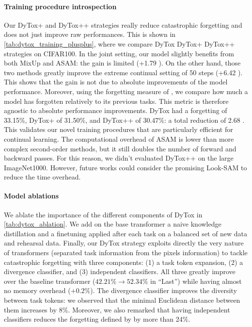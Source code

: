 \paragraph{Training procedure introspection} Our DyTox+ and DyTox++ strategies really reduce
catastrophic forgetting and does not just improve raw performances. This is shown in
\autoref{tab:dytox_training_plusplus}, where we compare DyTox \vs DyTox+ \vs DyTox++ strategies on
CIFAR100. In the joint setting, our model slightly benefits from both MixUp and ASAM: the gain is
limited (+1.79 \pp). On the other hand, those two methods greatly improve the extreme
continual setting of 50 steps (+6.42 \pp). This shows that the gain is not due to absolute
improvements of the model performance. Moreover, using the forgetting measure of
\citet{chaudhry2018riemannien_walk}, we compare how much a model has forgotten relatively to its
previous tasks. This metric is therefore agnostic to absolute performance improvements. DyTox had a
forgetting of 33.15\%, DyTox+ of 31.50\%, and DyTox++ of 30.47\%: a total reduction of 2.68 \pp.
This validates our novel training procedures that are particularly efficient for continual learning.
The computational overhead of ASAM is lower than more complex second-order methods, but it still
doubles the number of forward and backward passes. For this reason, we didn't evaluated DyTox++ on
the large ImageNet1000. However, future works could consider the promising Look-SAM
\cite{liu2021looksam} to reduce the time overhead.


\FloatBarrier

\label{sec:dytox_ablations}
\paragraph{Model ablations} We ablate the importance of the different components of DyTox in
\autoref{tab:dytox_ablation}. We add on the base transformer a naive knowledge distillation
\citep{hinton2015knowledge_distillation} and a finetuning
\citep{castro2018end_to_end_inc_learn} applied after each
task on a balanced set of new data and rehearsal data. Finally, our DyTox strategy exploits directly
the very nature of transformers (separated task information from the pixels information) to tackle
catastrophic forgetting with three components: (1) a task token expansion, (2) a divergence
classifier, and (3) independent classifiers. All three greatly improve over the baseline transformer
($42.21\% \rightarrow 52.34\%$ in ``Last'') while having almost no memory overhead ($+0.2\%$). The
divergence classifier improves the diversity between task tokens: we observed that the minimal
Euclidean distance between them increases by 8\%. Moreover, we also remarked that having independent
classifiers reduces the forgetting defined by \citet{chaudhry2018riemannien_walk} by more than
24\%.



